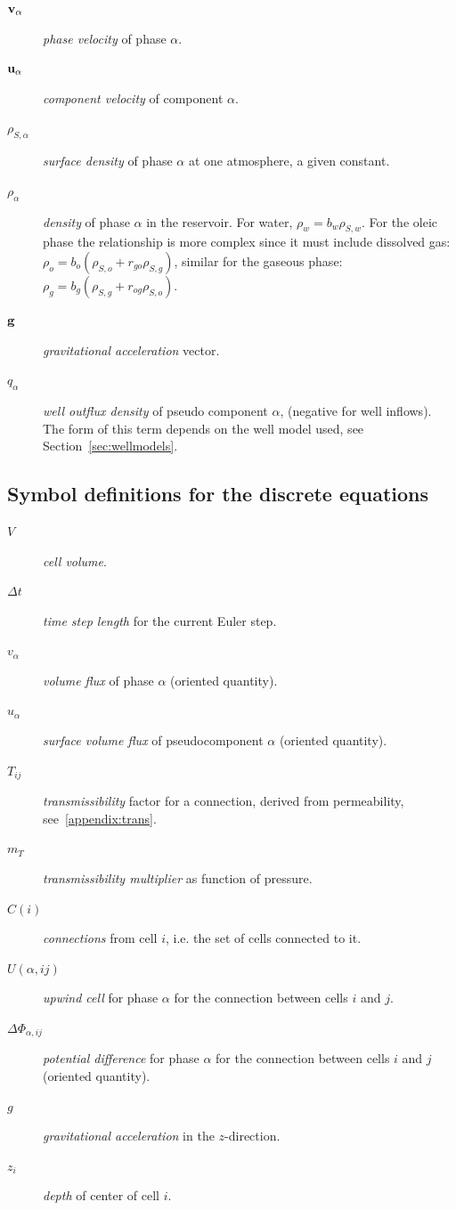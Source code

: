 \begin{description}
\item[${\bf v}_\alpha$] {\em phase velocity} of phase $\alpha$.
\item[${\bf u}_\alpha$] {\em component velocity} of component $\alpha$.
\item[$\rho_{S, \alpha}$] {\em surface density} of phase $\alpha$ at
  one atmosphere, a given constant.
\item[$\rho_\alpha$] {\em density} of phase $\alpha$ in the
  reservoir. For water, $\rho_w = b_w\rho_{S,w}$. For the oleic phase
  the relationship is more complex since it must include dissolved
  gas: $\rho_o = b_o(\rho_{S,o} + r_{go}\rho_{S,g})$, similar for the
  gaseous phase: $\rho_g = b_g(\rho_{S,g} + r_{og}\rho_{S,o})$.
\item[${\bf g}$] {\em gravitational acceleration} vector.
\item[$q_{\alpha}$] {\em well outflux density} of pseudo component $\alpha$,
  (negative for well inflows). The form of this term depends on the
  well model used, see Section~\ref{sec:wellmodels}.
\end{description}


\subsection{Symbol definitions for the discrete equations}
\label{appendix:nomenclature:disc}

\begin{description}
\item[$V$] {\em cell volume}.
\item[$\Delta t$] {\em time step length} for the current Euler step.
\item[$v_\alpha$] {\em volume flux} of phase $\alpha$ (oriented quantity).
\item[$u_\alpha$] {\em surface volume flux} of pseudocomponent $\alpha$ (oriented quantity).
\item[$T_{ij}$] {\em transmissibility} factor for a connection,
  derived from permeability, see~\ref{appendix:trans}.
\item[$m_T$] {\em transmissibility multiplier} as function of
  pressure.
\item[$C(i)$] {\em connections} from cell $i$, i.e. the set of cells
  connected to it.
\item[$U(\alpha, ij)$] {\em upwind cell} for phase $\alpha$ for the
  connection between cells $i$ and $j$.
\item[$\Delta \Phi_{\alpha, ij}$] {\em potential difference} for phase $\alpha$ for the
  connection between cells $i$ and $j$ (oriented quantity).
\item[$g$] {\em gravitational acceleration} in the $z$-direction.
\item[$z_i$] {\em depth} of center of cell $i$.
\end{description}


